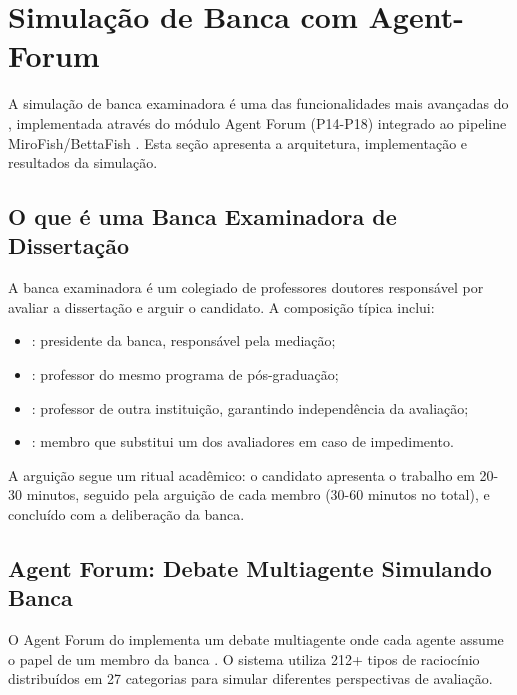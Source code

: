\section{Simulação de Banca com Agent-Forum}
\label{sec:simulacao-banca-agent-forum}
\nivelphd

A simulação de banca examinadora é uma das funcionalidades mais avançadas do
\opencodeeco{}, implementada através do módulo Agent Forum (P14-P18) integrado
ao pipeline MiroFish/BettaFish \cite{opencode2026ecosystem, opencode2026spec036}.
Esta seção apresenta a arquitetura, implementação e resultados da simulação.

\subsection{O que é uma Banca Examinadora de Dissertação}

A banca examinadora é um colegiado de professores doutores responsável por
avaliar a dissertação e arguir o candidato. A composição típica inclui:

\begin{itemize}
\item {}: presidente da banca, responsável pela mediação;
\item {}: professor do mesmo programa de
      pós-graduação;
\item {}: professor de outra instituição, garantindo
      independência da avaliação;
\item {}: membro que substitui um dos avaliadores em caso de
      impedimento.
\end{itemize}

A arguição segue um ritual acadêmico: o candidato apresenta o trabalho em 20-30
minutos, seguido pela arguição de cada membro (30-60 minutos no total), e
concluído com a deliberação da banca.

\subsection{Agent Forum: Debate Multiagente Simulando Banca}

O Agent Forum do \opencodeeco{} implementa um debate multiagente onde cada
agente assume o papel de um membro da banca \cite{wooldridge2009multiagent}.
O sistema utiliza 212+ tipos de raciocínio distribuídos em 27 categorias para
simular diferentes perspectivas de avaliação.


